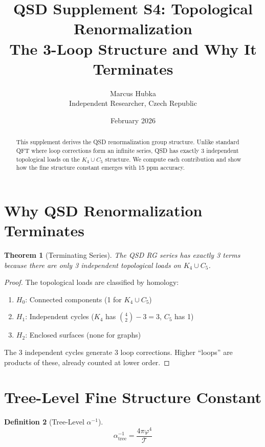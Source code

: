 \documentclass[11pt,a4paper]{article}
\title{\textbf{QSD Supplement S4: Topological Renormalization}\\[0.5em]
\large The 3-Loop Structure and Why It Terminates}
\author{Marcus Hubka\\
\small Independent Researcher, Czech Republic}
\date{February 2026}
\newtheorem{theorem}{Theorem}[section]
\theoremstyle{definition}
\newtheorem{definition}[theorem]{Definition}
\newcommand{\Tc}{\mathcal{T}}
\begin{document}
\maketitle

\begin{abstract}
This supplement derives the QSD renormalization group structure. Unlike standard QFT where loop corrections form an infinite series, QSD has exactly 3 independent topological loads on the $K_4 \cup C_5$ structure. We compute each contribution and show how the fine structure constant emerges with 15 ppm accuracy.
\end{abstract}

\tableofcontents

\section{Why QSD Renormalization Terminates}

\begin{theorem}[Terminating Series]
The QSD RG series has exactly 3 terms because there are only 3 independent topological loads on $K_4 \cup C_5$.
\end{theorem}

\begin{proof}
The topological loads are classified by homology:
\begin{enumerate}[nosep]
    \item $H_0$: Connected components (1 for $K_4 \cup C_5$)
    \item $H_1$: Independent cycles ($K_4$ has $\binom{4}{2} - 3 = 3$, $C_5$ has 1)
    \item $H_2$: Enclosed surfaces (none for graphs)
\end{enumerate}

The 3 independent cycles generate 3 loop corrections. Higher ``loops'' are products of these, already counted at lower order.
\end{proof}

\section{Tree-Level Fine Structure Constant}

\begin{definition}[Tree-Level $\alpha^{-1}$]
\begin{equation}
\alpha^{-1}_{\text{tree}} = \frac{4\pi\varphi^4}{\Tc}
\end{equation}
\end{definition}
\end{document}
